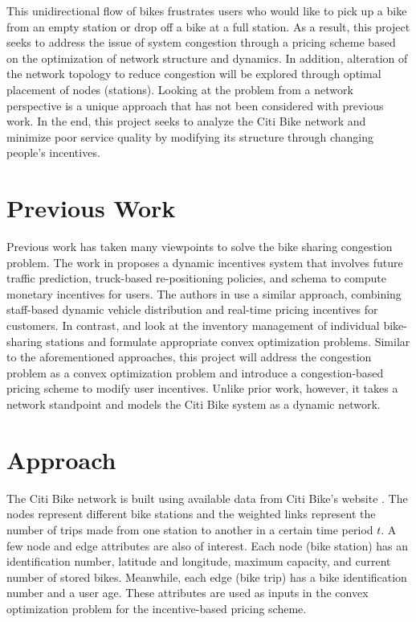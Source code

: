\documentclass[times, 10pt,twocolumn]{article}
\begin{document}
This unidirectional flow of bikes frustrates users who would like to pick up a bike from an empty station or drop off a bike at a full station. As a result, this project seeks to address the issue of system congestion through a pricing scheme based on the optimization of network structure and dynamics. In addition, alteration of the network topology to reduce congestion will be explored through optimal placement of nodes (stations). Looking at the problem from a network perspective is a unique approach that has not been considered with previous work. In the end, this project seeks to analyze the Citi Bike network and minimize poor service quality by modifying its structure through changing people's incentives.

\section{Previous Work}

Previous work has taken many viewpoints to solve the bike sharing congestion problem. The work in \cite{incentives} proposes a dynamic incentives system that involves future traffic prediction, truck-based re-positioning policies, and schema to compute monetary incentives for users. The authors in \cite{redistribution} use a similar approach, combining staff-based dynamic vehicle distribution and real-time pricing incentives for customers. In contrast, \cite{management} and \cite{redistribution} look at the inventory management of individual bike-sharing stations and formulate appropriate convex optimization problems. Similar to the aforementioned approaches, this project will address the congestion problem as a convex optimization problem and introduce a congestion-based pricing scheme to modify user incentives. Unlike prior work, however, it takes a network standpoint and models the Citi Bike system as a dynamic network.

\section{Approach}

The Citi Bike network is built using available data from Citi Bike's website \cite{dataset}. The nodes represent different bike stations and the weighted links represent the number of trips made from one station to another in a certain time period $t$. A few node and edge attributes are also of interest. Each node (bike station) has an identification number, latitude and longitude, maximum capacity, and current number of stored bikes. Meanwhile, each edge (bike trip) has a bike identification number and a user age. These attributes are used as inputs in the convex optimization problem for the incentive-based pricing scheme.
\end{document}
